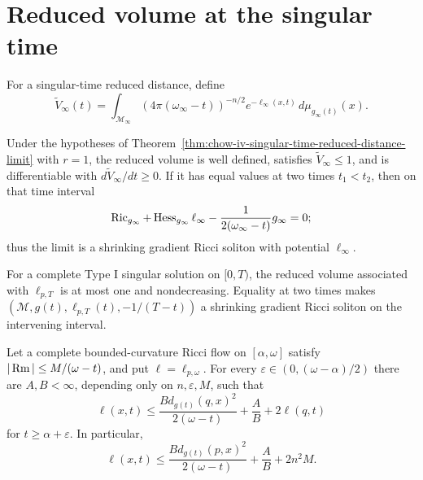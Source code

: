 \section{Reduced volume at the singular time}

For a singular-time reduced distance, define
\[
 \widetilde V_\infty(t)=
 \int_{\mathcal M_\infty}(4\pi(\omega_\infty-t))^{-n/2}
 e^{-\ell_\infty(x,t)}\,d\mu_{g_\infty(t)}(x).
\]

\begin{theorem}
\label{thm:chow-iv-singular-time-reduced-volume-monotonicity}
Under the hypotheses of
Theorem~\ref{thm:chow-iv-singular-time-reduced-distance-limit} with \(r=1\),
the reduced volume is well defined, satisfies \(\widetilde V_\infty\leq1\),
and is differentiable with \(d\widetilde V_\infty/dt\geq0\).  If it has
equal values at two times \(t_1<t_2\), then on that time interval
\[
 \operatorname{Ric}_{g_\infty}+\operatorname{Hess}_{g_\infty}\ell_\infty
 -\frac{1}{2(\omega_\infty-t)}g_\infty=0;
\]
thus the limit is a shrinking gradient Ricci soliton with potential
\(\ell_\infty\).
\end{theorem}

\begin{corollary}
\label{cor:chow-iv-type-i-singular-time-reduced-volume}
For a complete Type I singular solution on \([0,T)\), the reduced volume
associated with \(\ell_{p,T}\) is at most one and nondecreasing.  Equality at
two times makes
\((\mathcal M,g(t),\ell_{p,T}(t),-1/(T-t))\) a shrinking gradient Ricci
soliton on the intervening interval.
\end{corollary}

\begin{lemma}
\label{lem:chow-iv-type-i-reduced-distance-quadratic-upper-growth}
Let a complete bounded-curvature Ricci flow on \([\alpha,\omega]\) satisfy
\(|\operatorname{Rm}|\leq M/(\omega-t)\), and put \(\ell=\ell_{p,\omega}\).  For every
\(\varepsilon\in(0,(\omega-\alpha)/2)\) there are \(A,B<\infty\), depending
only on \(n,\varepsilon,M\), such that
\[
 \ell(x,t)\leq
 \frac{B d_{g(t)}(q,x)^2}{2(\omega-t)}+\frac AB+2\ell(q,t)
\]
for \(t\geq\alpha+\varepsilon\).  In particular,
\[
 \ell(x,t)\leq
 \frac{B d_{g(t)}(p,x)^2}{2(\omega-t)}+\frac AB+2n^2M.
\]
\end{lemma}

